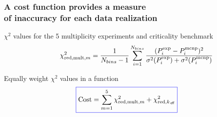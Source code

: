 \begin{frame}
\frametitle{A cost function provides a measure \\ of inaccuracy for each data realization}
\begin{itemize}
	{
    \item[]  $\chi^2$ values for the 5 multiplicity experiments and criticality benchmark
        \begin{equation*} \hspace{0.4in}
		\begin{array}{c} 
            \displaystyle	\chi^2_{\text{red,mult,}m} = \frac{1}{N_{bins}-1}\sum_{i=1}^{N_{bins}}
	\frac{(P^{\textrm{exp}}_i - P^{\textrm{mcnp}}_i)^2}{\sigma^2(P^{\textrm{exp}}_i) + 
\sigma^2(P^{\textrm{mcnp}}_i)} 
		\end{array}
	\end{equation*} 
    \vspace{0.0in}
\item[] Equally weight $\chi^2$ values in a  function \\ 
	\begin{equation*}
        \boxed{\text{Cost} = \sum_{m=1}^5 \chi^2_{\text{red,mult,}m} + \chi^2_{\text{red,}\keff}}
	\end{equation*} 
}
\end{itemize}

\end{frame} 




